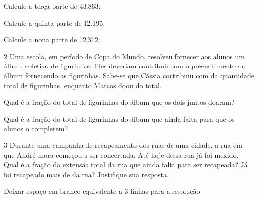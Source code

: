 \begin{mdframed}[linewidth=2pt,linecolor=salmao,roundcorner=2pt]
\begin{escolha}
{\begin{escolha}
\item
Calcule a terça parte de 43.863: 

\item
Calcule a quinta parte de 12.195: 

\item
Calcule a nona parte de 12.312: 

\end{escolha}

\num{2} Uma escola, em período de Copa do Mundo, resolveu fornecer aos alunos um
álbum coletivo de figurinhas. Eles deveriam contribuir com o
preenchimento do álbum fornecendo as figurinhas. Sabe-se que Cássia
contribuiu com  da quantidade total de figurinhas, enquanto Marcos
doou  do total.

\begin{escolha}
\item
  Qual é a fração do total de figurinhas do álbum que os dois juntos doaram?

\bigskip

\item
  Qual é a fração do total de figurinhas do álbum que ainda falta para que os alunos o completem?

\bigskip
\end{escolha}


\num{3} Durante uma campanha de recapeamento dos ruas de uma cidade, a rua em
que André mora começou a ser concertada. Até hoje  dessa rua já foi mexido.
Qual é a fração da extensão total da rua que ainda falta para ser
recapeada? Já foi recapeado mais de  da rua? Justifique sua resposta.

Deixar espaço em branco equivalente a 3 linhas para a resolução

\begin{mdframed}[linewidth=2pt,linecolor=salmao,roundcorner=2pt]

\vspace{2cm}
\end{mdframed}

}
\end{escolha}
\end{mdframed}

